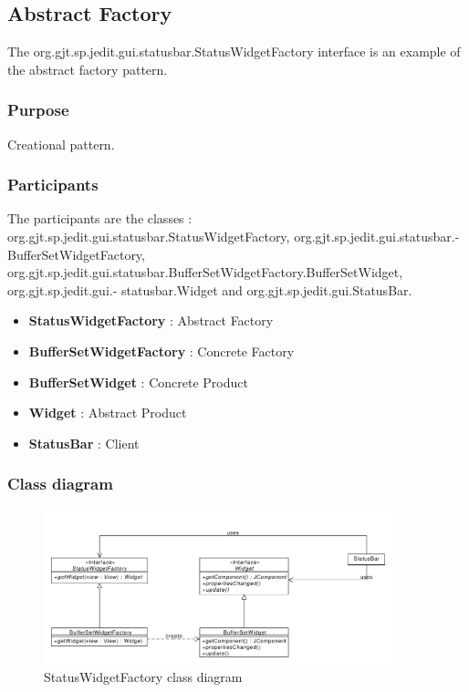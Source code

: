 \documentclass[a4paper,10pt]{article}
\begin{document}
\subsection{Abstract Factory}
The org.gjt.sp.jedit.gui.statusbar.StatusWidgetFactory interface is an example of the abstract factory pattern.

\subsubsection{Purpose}
Creational pattern.
\subsubsection[Participants]{Participants\footnotemark[1]}
The participants are the classes : org.gjt.sp.jedit.gui.statusbar.StatusWidgetFactory, org.gjt.sp.jedit.gui.statusbar.- BufferSetWidgetFactory, org.gjt.sp.jedit.gui.statusbar.BufferSetWidgetFactory.BufferSetWidget, org.gjt.sp.jedit.gui.- statusbar.Widget and org.gjt.sp.jedit.gui.StatusBar.

\begin{itemize}
 \item \textbf{StatusWidgetFactory} : Abstract Factory
 \item \textbf{BufferSetWidgetFactory} : Concrete Factory
 \item \textbf{BufferSetWidget} : Concrete Product
 \item \textbf{Widget} : Abstract Product
 \item \textbf{StatusBar} : Client
\end{itemize}

\subsubsection{Class diagram}
\begin{center}
\begin{figure}[h]
  \centerline{\includegraphics[width=0.9\textwidth]{abstractfactory-statuswidgetfactory-class-diagram.pdf}}
  \caption{StatusWidgetFactory class diagram}
\end{figure}
\end{center}
\end{document}
